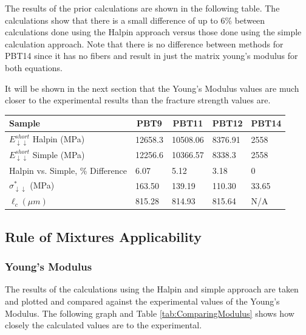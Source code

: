 \documentclass[11pt]{article}
\begin{document}
The results of the prior calculations are shown in the following table. The calculations show that there is a small difference of up to 6\% between calculations done using the Halpin approach versus those done using the simple calculation approach. Note that there is no difference between methods for PBT14 since it has no fibers and result in just the matrix young's modulus for both equations.

It will be shown in the next section that the Young's Modulus values are much closer to the experimental results than the fracture strength values are.

\begin{center}
 \label{tab:CalculatedValues}
\begin{tabular}{p{3.5cm} || p{} | p{} | p{} | p{}}
\hline
Sample & \multicolumn{1}{c|}{PBT9} & \multicolumn{1}{c|}{PBT11} & \multicolumn{1}{c|}{PBT12} & \multicolumn{1}{c}{PBT14} \\
\hline
\hline
\(E^{short}_{\downarrow \downarrow}\) Halpin (MPa)& 12658.3 &  10508.06 & 8376.91 & 2558\\
\(E^{short}_{\downarrow \downarrow}\) Simple (MPa)& 12256.6 & 10366.57 & 8338.3 & 2558\\
\hline
Halpin vs. Simple, \% Difference & 6.07 & 5.12 & 3.18 & 0\\
\hline
\(\sigma^*_{\downarrow \downarrow}\) (MPa)& 163.50 & 139.19 & 110.30 & 33.65\\
\(\ell_c (\mu m) \) & 815.28 & 814.93 & 815.64 & N/A\\
\hline

\end{tabular}
\end{center}
\singlespacing

\subsection{Rule of Mixtures Applicability}

\subsubsection{Young's Modulus}

The results of the calculations using the Halpin and simple approach are taken and plotted and compared against the experimental values of the Young's Modulus. The following graph and Table \ref{tab:ComparingModulus} shows how closely the calculated values are to the experimental.
\end{document}
